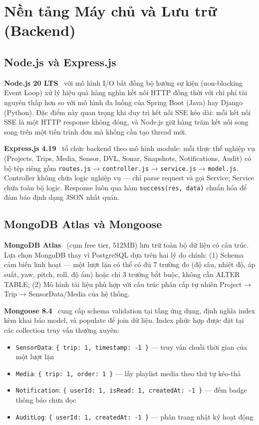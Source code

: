 \documentclass[../DoAn.tex]{subfiles}
\begin{document}
\section{Nền tảng Máy chủ và Lưu trữ (Backend)}
\label{section:3.2}

\subsection{Node.js và Express.js}

\textbf{Node.js 20 LTS}~\cite{nodejs} với mô hình I/O bất đồng bộ hướng sự kiện (non-blocking Event Loop) xử lý hiệu quả hàng nghìn kết nối HTTP đồng thời với chi phí tài nguyên thấp hơn so với mô hình đa luồng của Spring Boot (Java) hay Django (Python). Đặc điểm này quan trọng khi duy trì kết nối SSE kéo dài: mỗi kết nối SSE là một HTTP response không đóng, và Node.js giữ hàng trăm kết nối song song trên một tiến trình đơn mà không cần tạo thread mới.

\textbf{Express.js 4.19}~\cite{expressjs} tổ chức backend theo mô hình module: mỗi thực thể nghiệp vụ (Projects, Trips, Media, Sensor, DVL, Sonar, Snapshots, Notifications, Audit) có bộ tệp riêng gồm \texttt{routes.js} → \texttt{controller.js} → \texttt{service.js} → \texttt{model.js}. Controller không chứa logic nghiệp vụ --- chỉ parse request và gọi Service; Service chứa toàn bộ logic. Response luôn qua hàm \texttt{success(res, data)} chuẩn hóa để đảm bảo định dạng JSON nhất quán.

\subsection{MongoDB Atlas và Mongoose}

\textbf{MongoDB Atlas}~\cite{mongodb} (cụm free tier, 512MB) lưu trữ toàn bộ dữ liệu có cấu trúc. Lựa chọn MongoDB thay vì PostgreSQL dựa trên hai lý do chính: (1) Schema cảm biến linh hoạt --- một lượt lặn có thể có đủ 7 trường đo (độ sâu, nhiệt độ, áp suất, yaw, pitch, roll, độ ẩm) hoặc chỉ 3 trường bắt buộc, không cần ALTER TABLE; (2) Mô hình tài liệu phù hợp với cấu trúc phân cấp tự nhiên Project → Trip → SensorData/Media của hệ thống.

\textbf{Mongoose 8.4}~\cite{mongoose} cung cấp schema validation tại tầng ứng dụng, định nghĩa index kèm khai báo model, và populate để join dữ liệu. Index phức hợp được đặt tại các collection truy vấn thường xuyên:

\begin{itemize}[leftmargin=*, topsep=2pt, itemsep=1pt]
  \item \texttt{SensorData}: \texttt{\{ trip: 1, timestamp: -1 \}} --- truy vấn chuỗi thời gian của một lượt lặn
  \item \texttt{Media}: \texttt{\{ trip: 1, order: 1 \}} --- lấy playlist media theo thứ tự kéo-thả
  \item \texttt{Notification}: \texttt{\{ userId: 1, isRead: 1,\allowbreak{} createdAt: -1 \}} --- đếm badge thông báo chưa đọc
  \item \texttt{AuditLog}: \texttt{\{ userId: 1, createdAt: -1 \}} --- phân trang nhật ký hoạt động
\end{itemize}
\end{document}
